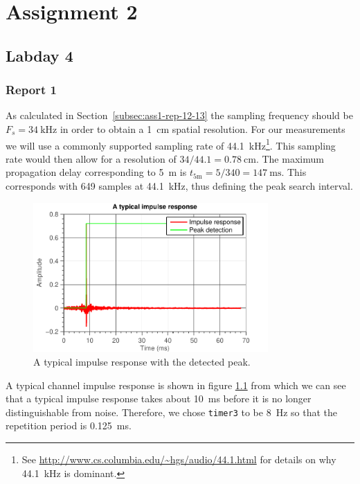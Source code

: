 \documentclass[11pt,titlepage]{report}
\begin{document}
\chapter{Assignment 2}
\section{Labday 4}

\subsection{Report 1}
\label{subsec:ass2-report-1}
As calculated in Section~\ref{subsec:ass1-rep-12-13} the sampling frequency should be $F_s=\SI{34}{\kilo\hertz}$ in order to obtain a \SI{1}{\centi\meter} spatial resolution. For our measurements we will use a commonly supported sampling rate of \SI{44.1}{\kilo\hertz}\footnote{See \url{http://www.cs.columbia.edu/~hgs/audio/44.1.html} for details on why \SI{44.1}{\kilo\hertz} is dominant.}. This sampling rate would then allow for a resolution of $34 / 44.1 = \SI{0.78}{\centi\meter}$. The maximum propagation delay corresponding to \SI{5}{\meter} is $t_{\text{5m}}=5/340=\SI{147}{\milli\second}$. This corresponds with \num{649} samples at \SI{44.1}{\kilo\hertz}, thus defining the peak search interval.

\begin{figure}[H]
	\centering
	\includegraphics[width=0.8\textwidth]{../../deliverable-7-resources/figures/ass-2/report-1/ass-2-report-1.pdf}
	\caption{A typical impulse response with the detected peak.}
	\label{fig:ass-2-rep-1-typical}
\end{figure}

A typical channel impulse response is shown in figure \ref{fig:ass-2-rep-1-typical} from which we can see that a typical impulse response takes about \SI{10}{\milli\second} before it is no longer distinguishable from noise. Therefore, we chose \texttt{timer3} to be \SI{8}{\hertz} so that the repetition period is \SI{0.125}{\milli\second}.
\end{document}
